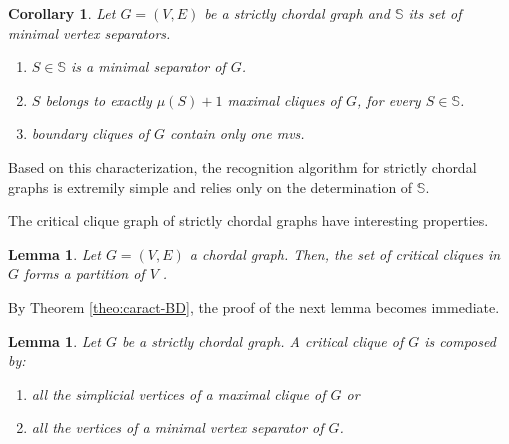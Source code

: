 \documentclass[preprint,12pt]{elsarticle}
\newtheorem{lemma}[theorem]{Lemma}
\newtheorem{corollary}{Corollary}[theorem]
\begin{document}
  \begin{corollary}  \label{prop:sc}  Let $G=(V,E)$ be  a strictly chordal graph and $\mathbb S$ its set of minimal vertex separators.
 \begin{enumerate}
 
 \item[(a)]  $S \in {\mathbb S}$  is a minimal separator of $G$.

  \item[(b)] $S$ belongs to exactly $\mu(S)+1$ maximal cliques of $G$, for every  $S \in {\mathbb S}$.
    
 \item[(c)] boundary cliques of $G$ contain only one mvs. 

  \end{enumerate}
 \end{corollary}


Based on this characterization, the recognition algorithm for strictly chordal graphs is extremily simple and 
 relies only on the determination of $\mathbb S$.

The critical clique graph of strictly chordal graphs have interesting properties.


\begin{lemma}{\rm \cite{LKJ02}}
Let $G=(V,E)$ a chordal graph. Then, the set of critical cliques in $G$ forms a partition of $V$ .
\end{lemma}


By Theorem \ref{theo:caract-BD}, the proof of the next lemma becomes immediate. 

\begin{lemma}\label{lem:vertices-cliques}
Let $G$ be a strictly chordal graph.
A critical clique of $G$ is  composed by:
\begin{enumerate}
\item all the simplicial vertices of a maximal clique of $G$ or
\item all the vertices of a minimal vertex separator of $G$.
\end{enumerate}
\end{lemma}


\end{document}
